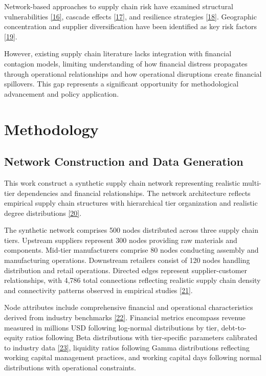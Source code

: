 \documentclass[a4 paper, 11pt,twoside]{article}
\newcommand{\0}{\Bf{0}}
\theoremstyle{definition}
\begin{document}
Network-based approaches to supply chain risk have examined structural vulnerabilities \hyperref[ref16]{[16]}, cascade effects \hyperref[ref17]{[17]}, and resilience strategies \hyperref[ref18]{[18]}. Geographic concentration and supplier diversification have been identified as key risk factors \hyperref[ref19]{[19]}.

However, existing supply chain literature lacks integration with financial contagion models, limiting understanding of how financial distress propagates through operational relationships and how operational disruptions create financial spillovers. This gap represents a significant opportunity for methodological advancement and policy application.

\section{Methodology}

\subsection{Network Construction and Data Generation}

This work construct a synthetic supply chain network representing realistic multi-tier dependencies and financial relationships. The network architecture reflects empirical supply chain structures with hierarchical tier organization and realistic degree distributions \hyperref[ref20]{[20]}.

The synthetic network comprises 500 nodes distributed across three supply chain tiers. Upstream suppliers represent 300 nodes providing raw materials and components. Mid-tier manufacturers comprise 80 nodes conducting assembly and manufacturing operations. Downstream retailers consist of 120 nodes handling distribution and retail operations. Directed edges represent supplier-customer relationships, with 4,786 total connections reflecting realistic supply chain density and connectivity patterns observed in empirical studies \hyperref[ref21]{[21]}.

Node attributes include comprehensive financial and operational characteristics derived from industry benchmarks \hyperref[ref22]{[22]}. Financial metrics encompass revenue measured in millions USD following log-normal distributions by tier, debt-to-equity ratios following Beta distributions with tier-specific parameters calibrated to industry data \hyperref[ref23]{[23]}, liquidity ratios following Gamma distributions reflecting working capital management practices, and working capital days following normal distributions with operational constraints.
\end{document}

